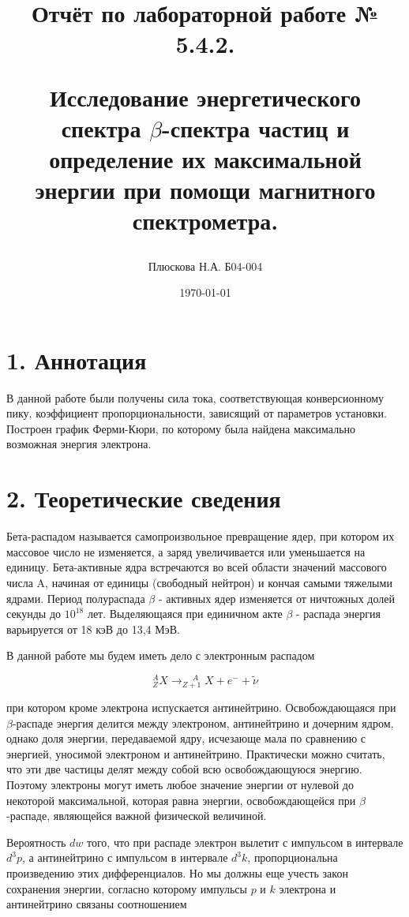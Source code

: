 \documentclass[a4paper,12pt]{report}
\title{Отчёт по лабораторной работе № 5.4.2. 

Исследование энергетического спектра $\beta$-спектра частиц и определение их максимальной энергии при помощи магнитного спектрометра.}
\author{Плюскова Н.А. Б04-004 }
\date{\today}
\begin{document}
\maketitle
\section*{1. Аннотация}
В данной работе были получены сила тока, соответствующая конверсионному пику, коэффициент пропорциональности, зависящий от параметров установки. Построен график Ферми-Кюри, по которому была найдена максимально возможная энергия электрона.

\section*{2. Теоретические сведения}
Бета-распадом называется самопроизвольное превращение ядер, при котором их массовое число не изменяется, а заряд увеличивается или уменьшается на единицу. Бета-активные ядра встречаются во всей области значений массового числа A, начиная от единицы (свободный нейтрон) и кончая самыми тяжелыми ядрами. Период полураспада $\beta$ - активных ядер изменяется от ничтожных долей секунды до $10^{18}$ лет. Выделяющаяся при единичном акте $\beta$ - распада энергия варьируется от 18 кэВ до 13,4 МэВ.

В данной работе мы будем иметь дело с электронным распадом

\begin{equation}\label{}
^A_ZX \rightarrow ^{\; \; \; \; \: A}_{Z+1}X + e^- + \widetilde{\nu}
\end{equation}

при котором кроме электрона испускается антинейтрино. Освобождающаяся при $\beta$-распаде энергия делится между электроном, антинейтрино и дочерним ядром, однако доля энергии, передаваемой ядру, исчезающе мала по сравнению с энергией, уносимой электроном и антинейтрино. Практически можно считать, что эти две частицы делят между собой всю освобождающуюся энергию. Поэтому электроны могут иметь любое значение энергии  от нулевой до некоторой максимальной, которая равна энергии, освобождающейся при $\beta$-распаде, являющейся важной физической величиной.

Вероятность $ dw $ того, что при распаде электрон вылетит с импульсом в интервале $d^3p$, а антинейтрино с импульсом в интервале $d^3k$, пропорциональна произведению этих дифференциалов. Но мы должны еще учесть закон сохранения энергии, согласно которому импульсы $ p $ и $ k $ электрона и антинейтрино связаны соотношением
\end{document}
